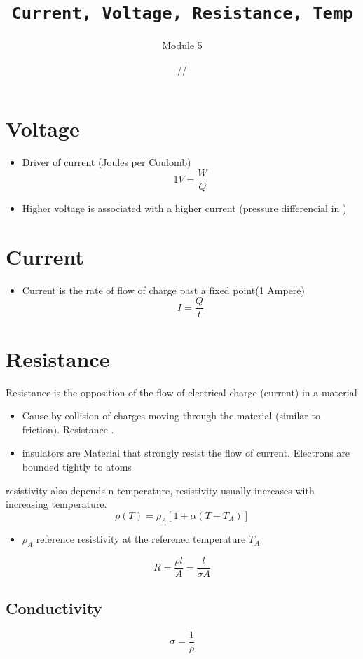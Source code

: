\documentclass[a4paper,12pt]{article}
\title{\texttt{Current, Voltage, Resistance, Temp}\\\hrulefill}
\author{Module 5}
\date{\small{//}}
\begin{document}
    \maketitle

    \section{Voltage}
    \begin{itemize}
        \item Driver of current (Joules per Coulomb) \[1V=\frac{W}{Q}\]
        \item Higher voltage is associated with a higher current (pressure differencial in )
    \end{itemize}
    \section{Current}
    \begin{itemize}
        \item Current is the rate of flow of charge past a fixed point(1 Ampere) \[I=\frac{Q}{t}\]
    \end{itemize}
    \section{Resistance}
        Resistance is the opposition of the flow of electrical charge (current) in a material
        \begin{itemize}
            \item Cause by collision of charges moving through the material (similar to friction). Resistance .
            \item insulators are Material that strongly resist the flow of current. Electrons are bounded tightly to atoms
        \end{itemize}

        resistivity also depends n temperature, resistivity usually increases with increasing temperature. \[\rho(T)=\rho_A[1+\alpha(T-T_A)]\]
             \begin{itemize}
                \item $\rho_A$ reference resistivity at the referenec temperature $T_A$
            \end{itemize}
            \[R=\frac{\rho l}{A}=\frac{l}{\sigma A}\]

        \subsection*{Conductivity}
            \[\sigma = \frac{1}{\rho}\]
\end{document}

